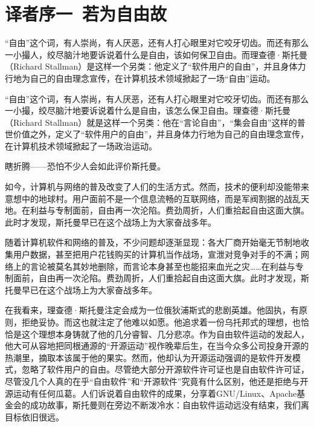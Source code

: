 \chapter{译者序一\ 若为自由故}
\thispagestyle{empty}

\ifdefined\nov
``自由''这个词，有人崇尚，有人厌恶，还有人打心眼里对它咬牙切齿。而还有那么一小撮人，绞尽脑汁地要诉说着什么是自由，该如何保卫自由。而理查德·斯托曼（Richard Stallman）是这样一个另类：他定义了``软件用户的自由''，并且身体力行地为自己的自由理念宣传，在计算机技术领域掀起了一场``自由''运动。
\fi

\ifdefined\spv
``自由''这个词，有人崇尚，有人厌恶，还有人打心眼里对它咬牙切齿。而还有那么一小撮，绞尽脑汁地要诉说着什么是自由，该怎么保卫自由。理查德·斯托曼（Richard Stallman）就是这样一个另类：他在``言论自由''，``集会自由''这样的普世价值之外，定义了``软件用户的自由''，并且身体力行地为自己的自由理念宣传，在计算机技术领域掀起了一场政治运动。
\fi

瞎折腾——恐怕不少人会如此评价斯托曼。

\ifdefined\nov
如今，计算机与网络的普及改变了人们的生活方式。然而，技术的便利却没能带来意想中的地球村。用户面前不是一个信息流畅的互联网络，而是军阀割据的战乱天地。在利益与专制面前，自由再一次沦陷。费劲周折，人们重拾起自由这面大旗。此时才发现，斯托曼早已在这个战场上为大家奋战多年。
\fi

\ifdefined\spv
随着计算机软件和网络的普及，不少问题却逐渐显现：各大厂商开始毫无节制地收集用户数据，甚至把用户花钱购买的计算机当作战场，宣泄对竞争对手的不满；网络上的言论被莫名其妙地删除，而言论本身甚至也能招来血光之灾……在利益与专制面前，自由再一次沦陷。费劲周折，人们重拾起自由这面大旗。此时才发现，斯托曼早已在这个战场上为大家奋战多年。
\fi

在我看来，理查德·斯托曼注定会成为一位俄狄浦斯式的悲剧英雄。他固执，有原则，拒绝妥协。而这也就注定了他难以如愿。他追求着一份乌托邦式的理想，也恰恰是这个理想本身铸就了他的几分睿智、几分悲凉。作为自由软件运动的发起人，他大可从容地把同根通源的``开源运动''视作晚辈后生，在当今众多公司投身开源的热潮里，摘取本该属于他的果实。然而，他却认为开源运动强调的是软件开发模式，忽略了软件用户的自由。尽管绝大部分开源软件许可证也是自由软件许可证，尽管没几个人真的在乎``自由软件''和``开源软件''究竟有什么区别，他还是拒绝与开源运动有任何瓜葛。人们诉说着自由软件的成果，分享着GNU/Linux、Apache基金会的成功故事，斯托曼则在旁边不断泼冷水：自由软件运动远没有结束，我们离目标依旧很远。

